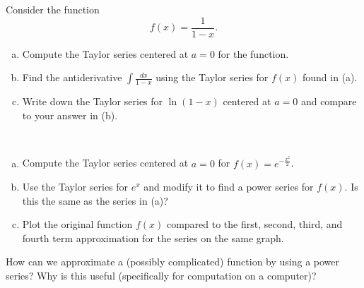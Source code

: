 \documentclass[12pt]{article} %
\begin{document}


\begin{problem} Consider the function
\[
f(x)=\frac{1}{1-x}.
\]
\begin{enumerate}[(a)]
    \item Compute the Taylor series centered at $a=0$ for the function.
    \item Find the antiderivative $\int \frac{dx}{1-x}$ using the Taylor series for $f(x)$ found in (a).  
    \item Write down the Taylor series for $\ln(1-x)$ centered at $a=0$ and compare to your answer in (b).
\end{enumerate}
\end{problem}

\begin{problem}~
\begin{enumerate}[(a)]
    \item Compute the Taylor series centered at $a=0$ for $f(x)=e^{-\frac{x^2}{2}}$.
    \item Use the Taylor series for $e^x$ and modify it to find a power series for $f(x)$. Is this the same as the series in (a)?
    \item Plot the original function $f(x)$ compared to the first, second, third, and fourth term approximation for the series on the same graph.
\end{enumerate}
\end{problem}

\begin{problem}
How can we approximate a (possibly complicated) function by using a power series? Why is this useful (specifically for computation on a computer)?
\end{problem}
\end{document}
